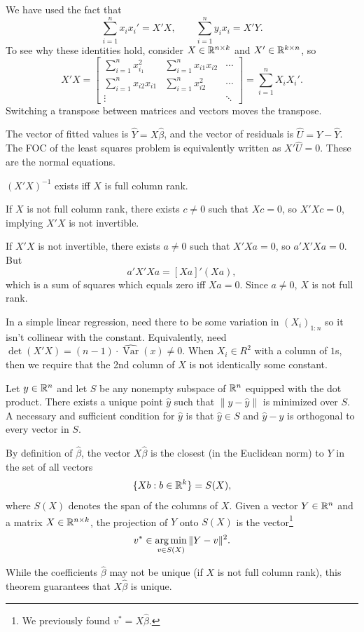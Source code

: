\begin{remark}	We have used the fact that
	\[
		\sum_{i=1}^n x_ix_i'=X'X,\qquad
		\sum_{i=1}^n y_ix_i=X'Y.
	\]
	To see why these identities hold, consider $X \in \mathbb{R}^{n\times k}$ and $X' \in \mathbb{R}^{k\times n}$, so \[
		X'X = \begin{bmatrix}
			\sum\limits_{i=1}^{n} x_{i_1}^2 & \sum\limits_{i=1}^{n} x_{i 1} x_{i 2} & \cdots \\
		\sum\limits_{i=1}^{n} x_{i 2}x_{i 1} & \sum\limits_{i=1}^{n} x_{i 2}^2 & \cdots \\
		\vdots & & \ddots
		\end{bmatrix} = \sum\limits_{i=1}^{n} X_i X_i'
	.\] Switching a transpose between matrices and vectors moves the transpose.

	The vector of fitted values is $\hat Y=X\hat\beta$, and the vector of residuals is $\hat U=Y-\hat Y$. The FOC of the least squares problem is equivalently written as $X'\hat U=0$. These are the normal equations.
\end{remark}

\begin{proposition}	$(X'X)^{-1}$ exists iff $X$ is full column rank.

	If $X$ is not full column rank, there exists $c\neq 0$ such that $Xc=0$, so $X'Xc=0$, implying $X'X$ is not invertible.

	If $X'X$ is not invertible, there exists $a\neq 0$ such that $X'Xa=0$, so $a'X'Xa=0$. But
	\[
		a'X'Xa=[Xa]'(Xa),
	\]
	which is a sum of squares which equals zero iff $Xa=0$. Since $a\neq 0$, $X$ is not full rank.

	In a simple linear regression, need there to be some variation in $\left( X_i \right)_{1:n}$ so it isn't collinear with the constant. Equivalently, need $\det(X'X)=(n-1)\cdot\widehat{\operatorname{Var}}(x)\neq 0$. When $X_i \in R^2$ with a column of $1$s, then we require that the 2nd column of $X$ is not identically some constant.
\end{proposition}

\begin{theorem}
	Let $y\in\mathbb{R}^n$ and let $S$ be any nonempty subspace of $\mathbb{R}^n$ equipped with the dot product. There exists a unique point $\hat y$ such that $\|y-\hat y\|$ is minimized over $S$. A necessary and sufficient condition for $\hat y$ is that $\hat{y} \in S$ and $\hat y-y$ is orthogonal to every vector in $S$.

	By definition of $\hat\beta$, the vector $X\hat\beta$ is the closest (in the Euclidean norm) to $Y$ in the set of all vectors
	\[
		\{Xb:b\in\mathbb{R}^k\}=S(X),
	\]
	where $S(X)$ denotes the span of the columns of $X$. Given a vector $Y\in\mathbb{R}^n$ and a matrix $X\in\mathbb{R}^{n\times k}$, the projection of $Y$ onto $S(X)$ is the vector\footnote{We previously found $v^* = X\hat{\beta}$.}
	\[
		v^*\in\operatorname*{arg\,min}_{v\in S(X)}\|Y-v\|^2.	
	\]

	While the coefficients $\hat{\beta}$ may not be unique (if $X$ is not full column rank), this theorem guarantees that $X\hat{\beta}$ is unique. 
\end{theorem}

